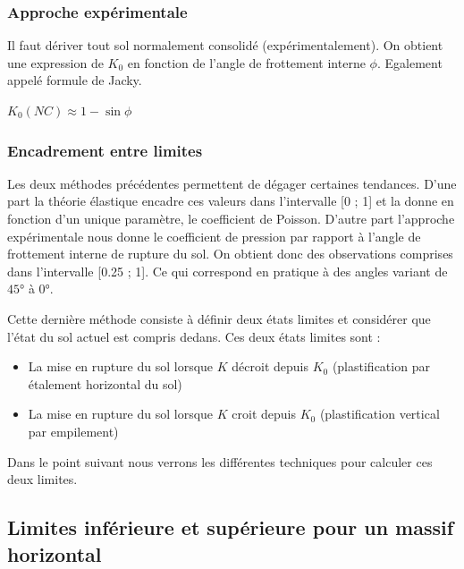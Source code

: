         
    \subsubsection{Approche expérimentale}
    
        Il faut dériver tout sol normalement consolidé (expérimentalement). On obtient une expression de $K_0$ en fonction de l'angle de frottement interne $\phi$. Egalement appelé formule de Jacky.
        
        \begin{center}
            $K_0 (NC) \approx 1 - \sin \phi$
        \end{center}
        
    \subsubsection{Encadrement entre limites}
    
        Les deux méthodes précédentes permettent de dégager certaines tendances. D'une part la théorie élastique encadre ces valeurs dans l'intervalle [0 ; 1] et la donne en fonction d'un unique paramètre, le coefficient de Poisson. D'autre part l'approche expérimentale nous donne le coefficient de pression par rapport à l'angle de frottement interne de rupture du sol. On obtient donc des observations comprises dans l'intervalle [0.25 ; 1]. Ce qui correspond en pratique à des angles variant de $45°$ à $0°$. 
        
        Cette dernière méthode consiste à définir deux états limites et considérer que l'état du sol actuel est compris dedans. Ces deux états limites sont :
        
        \begin{itemize}
            \item La mise en rupture du sol lorsque $K$ décroit depuis $K_0$ (plastification par étalement horizontal du sol)
            \item La mise en rupture du sol lorsque $K$ croit depuis $K_0$ (plastification vertical par empilement)
        \end{itemize}
        
        Dans le point suivant nous verrons les différentes techniques pour calculer ces deux limites.
        
    \subsection{Limites inférieure et supérieure pour un massif horizontal}
    
